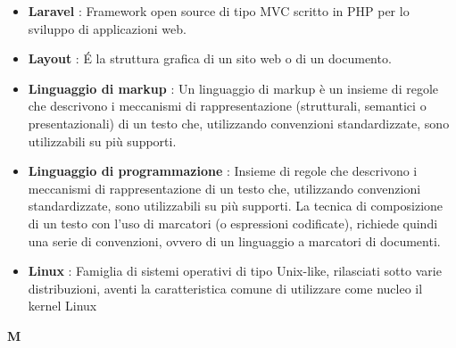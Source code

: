 \begin{flushleft}
\begin{itemize}[label={}]
\item \textbf{Laravel} : Framework open source di tipo MVC scritto in PHP per lo sviluppo di applicazioni web.
\item \textbf{Layout} : \'E la struttura grafica di un sito web o di un documento.
\item \textbf{Linguaggio di markup} : Un linguaggio di markup è un insieme di regole che descrivono i meccanismi di rappresentazione (strutturali, semantici o presentazionali) di un testo che, utilizzando convenzioni standardizzate, sono utilizzabili su più supporti.
\item \textbf{Linguaggio di programmazione} : Insieme di regole che descrivono i meccanismi di rappresentazione di un testo che, utilizzando convenzioni standardizzate, sono utilizzabili su più supporti. La tecnica di composizione di un testo con l'uso di marcatori (o espressioni codificate), richiede quindi una serie di convenzioni, ovvero di un linguaggio a marcatori di documenti.
\item \textbf{Linux} : Famiglia di sistemi operativi di tipo Unix-like, rilasciati sotto varie distribuzioni, aventi la caratteristica comune di utilizzare come nucleo il kernel Linux
\end{itemize}
\end{flushleft}
\newpage
{\huge \textbf{M}}
